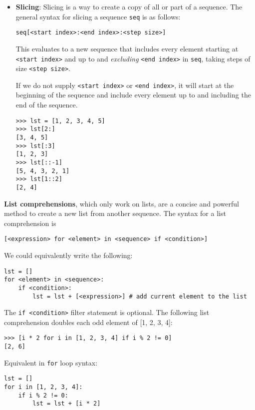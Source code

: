 \begin{itemize}
\item \textbf{Slicing}: Slicing is a way to create a copy of all or part of a sequence. The general syntax for slicing a sequence \lstinline{seq} is as follows:
	\begin{lstlisting}
seq[<start index>:<end index>:<step size>]
	\end{lstlisting}

This evaluates to a new sequence that includes every element starting at \lstinline{<start index>} and up to and \textit{excluding} \lstinline{<end index>} in \lstinline{seq}, taking steps of size \lstinline{<step size>}. 

If we do not supply \lstinline{<start index>} or \lstinline{<end index>}, it will start at the beginning of the sequence and include every element up to and including the end of the sequence. 

\begin{lstlisting}
>>> lst = [1, 2, 3, 4, 5]
>>> lst[2:] 
[3, 4, 5]
>>> lst[:3] 
[1, 2, 3]
>>> lst[::-1] 
[5, 4, 3, 2, 1]
>>> lst[1::2] 
[2, 4]
\end{lstlisting}

\end{itemize}
\vspace{0.5 in}
\textbf{List comprehensions}, which only work on lists, are a concise and powerful method to create a new list from another sequence. The syntax for a list comprehension is
   \begin{lstlisting}
[<expression> for <element> in <sequence> if <condition>]
   \end{lstlisting}

\begin{blocksection}
We could equivalently write the following: 
\begin{lstlisting}
lst = []
for <element> in <sequence>:
	if <condition>:
		lst = lst + [<expression>] # add current element to the list
\end{lstlisting}
\end{blocksection}

\begin{blocksection}
The \lstinline{if <condition>} filter statement is optional. The following list comprehension doubles each odd element of [1, 2, 3, 4]:
\begin{lstlisting}
>>> [i * 2 for i in [1, 2, 3, 4] if i % 2 != 0] 
[2, 6]
\end{lstlisting}
\end{blocksection}

\begin{blocksection}
Equivalent in \lstinline{for} loop syntax:
\begin{lstlisting}
lst = []
for i in [1, 2, 3, 4]:
	if i % 2 != 0:
		lst = lst + [i * 2]
\end{lstlisting}
\end{blocksection}

